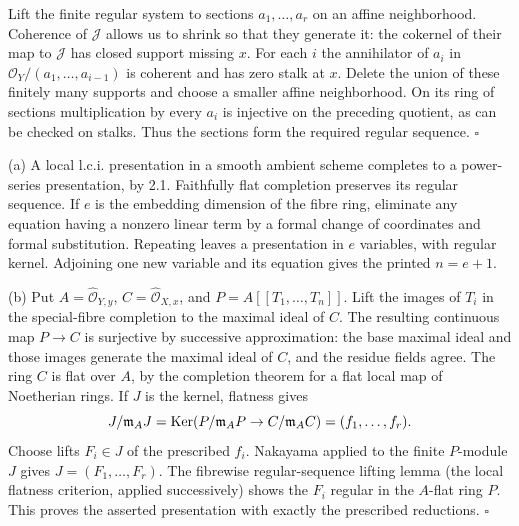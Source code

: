 \documentclass[11pt]{article}
\let\chapterexercise\exercise
\renewcommand{\exercise}[2]{\Needspace{8\baselineskip}\chapterexercise{#1}{#2}}
\begin{document}
\pf
Lift the finite regular system to sections $a_1,\ldots,a_r$ on an affine neighborhood. Coherence of $\mathcal J$ allows us to shrink so that they generate it: the cokernel of their map to $\mathcal J$ has closed support missing $x$. For each $i$ the annihilator of $a_i$ in $\mathcal O_Y/(a_1,\ldots,a_{i-1})$ is coherent and has zero stalk at $x$. Delete the union of these finitely many supports and choose a smaller affine neighborhood. On its ring of sections multiplication by every $a_i$ is injective on the preceding quotient, as can be checked on stalks. Thus the sections form the required regular sequence. \hfill$\square$

\pf
(a) A local l.c.i. presentation in a smooth ambient scheme completes to a power-series presentation, by 2.1. Faithfully flat completion preserves its regular sequence. If $e$ is the embedding dimension of the fibre ring, eliminate any equation having a nonzero linear term by a formal change of coordinates and formal substitution. Repeating leaves a presentation in $e$ variables, with regular kernel. Adjoining one new variable and its equation gives the printed $n=e+1$.

(b) Put $A=\widehat{\mathcal O}_{Y,y}$, $C=\widehat{\mathcal O}_{X,x}$, and $P=A[[T_1,\ldots,T_n]]$. Lift the images of $T_i$ in the special-fibre completion to the maximal ideal of $C$. The resulting continuous map $P\to C$ is surjective by successive approximation: the base maximal ideal and those images generate the maximal ideal of $C$, and the residue fields agree. The ring $C$ is flat over $A$, by the completion theorem for a flat local map of Noetherian rings. If $J$ is the kernel, flatness gives
\[ J/\mathfrak m_AJ=\operatorname{Ker}(P/\mathfrak m_AP\to C/\mathfrak m_AC)=(f_1,\ldots,f_r). \]
Choose lifts $F_i\in J$ of the prescribed $f_i$. Nakayama applied to the finite $P$-module $J$ gives $J=(F_1,\ldots,F_r)$. The fibrewise regular-sequence lifting lemma (the local flatness criterion, applied successively) shows the $F_i$ regular in the $A$-flat ring $P$. This proves the asserted presentation with exactly the prescribed reductions. \hfill$\square$
\end{document}
